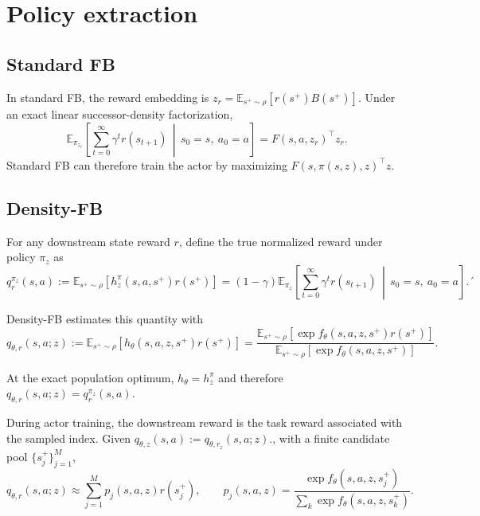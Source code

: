 \documentclass[11pt]{article}
\begin{document}
\section{Policy extraction}
\label{sec:policy-extraction}


\subsection{Standard FB}

In standard FB, the reward embedding is $z_r = \mathbb E_{s^+\sim\rho}[r(s^+)B(s^+)].$
Under an exact linear successor-density factorization,
\[
    \mathbb E_{\pi_{z_r}}\left[\sum_{t=0}^{\infty}\gamma^t r(s_{t+1}) \,\middle|\, s_0=s,\ a_0=a\right] = F(s,a,z_r)^\top z_r.
\]
Standard FB can therefore train the actor by maximizing $F(s,\pi(s,z),z)^\top z$.

\subsection{Density-FB}

For any downstream state reward $r$, define the true normalized reward under policy $\pi_z$ as
\begin{equation}
    q_r^{\pi_z}(s,a) := \mathbb E_{s^+\sim\rho}\left[h_z^\pi(s,a,s^+)r(s^+)\right] = (1-\gamma)\mathbb E_{\pi_z}\left[\sum_{t=0}^{\infty}\gamma^t r(s_{t+1}) \,\middle|\, s_0=s,\ a_0=a\right].´
    \label{eq:true-normalized-value}
\end{equation}

Density-FB estimates this quantity with
\begin{equation}
\boxed{
    q_{\theta,r}(s,a;z) := \mathbb E_{s^+\sim\rho}\left[h_\theta(s,a,z,s^+)r(s^+)\right] = \frac{\mathbb E_{s^+\sim\rho}\left[\exp f_\theta(s,a,z,s^+)r(s^+)\right]}{\mathbb E_{s^+\sim\rho}\left[\exp f_\theta(s,a,z,s^+)\right]}.
}
\label{eq:model-reward-value}
\end{equation}

At the exact population optimum, $h_\theta=h_z^\pi$ and therefore $q_{\theta,r}(s,a;z)=q_r^{\pi_z}(s,a)$. 

During actor training, the downstream reward is the task reward associated with the sampled index. 
Given $q_{\theta,z}(s,a) := q_{\theta,r_z}(s,a;z).$, with a finite candidate pool $\{s_j^+\}_{j=1}^{M}$,
\[
    q_{\theta,r}(s,a;z) \approx \sum_{j=1}^{M}p_j(s,a,z)r(s_j^+), \qquad p_j(s,a,z) = \frac{\exp f_\theta(s,a,z,s_j^+)}{\sum_k\exp f_\theta(s,a,z,s_k^+)}.
\]
\end{document}
